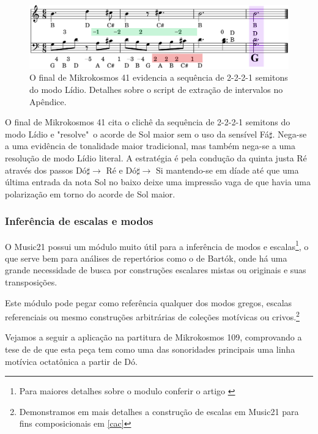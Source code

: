 \documentclass[
	12pt,				%
	openright,			%
	twoside,			%
	a4paper,			%
	english,			%
	french,				%
	spanish,			%
	brazil				%
	]{abntex2}
\begin{document}
\begin{figure}[!h]
	\caption{\label{fig_grafico}O final de Mikrokosmos 41 evidencia a sequência de 2-2-2-1 semitons do modo Lídio. Detalhes sobre o script de extração de intervalos no Apêndice. } 
	\begin{center}
	    \includegraphics[scale=0.3]{estudosM21/mikro041FinalChords_contorno.png}
	\end{center}
\end{figure}

O final de Mikrokosmos 41 cita o clichê da sequência de 2-2-2-1 semitons do modo Lídio e "resolve"\ o acorde de Sol maior sem o uso da sensível Fá$\sharp$. Nega-se a uma evidência de tonalidade maior tradicional, mas também nega-se a uma resolução de modo Lídio literal. A estratégia é pela condução da quinta justa Ré através dos passos Dó$\sharp \rightarrow $ Ré e Dó$\sharp \rightarrow $ Si mantendo-se em díade até que uma última entrada da nota Sol no baixo deixe uma impressão vaga de que havia uma polarização em torno do acorde de Sol maior. 

\subsubsection{Inferência de escalas e modos}

O Music21 possui um módulo muito útil para a inferência de modos e escalas\footnote{Para maiores detalhes sobre o modulo conferir o artigo \cite{ariza2011analytical}}, o que serve bem para análises de repertórios como o de Bartók, onde há uma grande necessidade de busca por construções escalares mistas ou originais e suas transposições.

Este módulo pode pegar como referência qualquer dos modos gregos, escalas referenciais ou mesmo construções arbitrárias de coleções motívicas ou crivos.\footnote{Demonstramos em mais detalhes a construção de escalas em Music21 para fins composicionais em \autoref{cac} }

Vejamos a seguir a aplicação na partitura de Mikrokosmos 109, comprovando a tese de  de que esta peça tem como uma das sonoridades principais uma linha motívica octatônica a partir de Dó.
\end{document}
